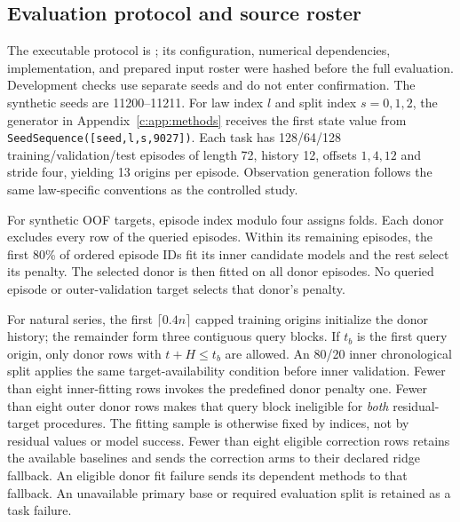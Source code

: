 \subsection{Evaluation protocol and source roster}
\label{app:target-protocol}

The executable protocol is ;
its configuration, numerical dependencies, implementation, and prepared
input roster were hashed before the full evaluation. Development checks use separate
seeds and do not enter confirmation. The synthetic seeds are
11200--11211. For law index $l$ and split index $s=0,1,2$, the generator in Appendix~\ref{c:app:methods} receives the first state value from
\texttt{SeedSequence([seed,l,s,9027])}. Each task has 128/64/128
training/validation/test episodes of length 72, history 12, offsets
$1,4,12$ and stride four, yielding 13 origins per episode.
Observation generation follows the same law-specific conventions as
the controlled study.

For synthetic OOF targets, episode index modulo four assigns folds.
Each donor excludes every row of the queried episodes. Within its
remaining episodes, the first 80\% of ordered episode IDs fit its
inner candidate models and the rest select its penalty. The selected
donor is then fitted on all donor episodes. No queried episode or
outer-validation target selects that donor's penalty.

For natural series, the first $\lceil0.4n\rceil$ capped training origins
initialize the donor history; the remainder form three contiguous query
blocks. If $t_b$ is the first query origin, only donor rows with
$t+H\leq t_b$ are allowed. An 80/20 inner chronological split applies
the same target-availability condition before inner validation.
Fewer than eight inner-fitting rows invokes the predefined donor
penalty one. Fewer than eight outer donor rows makes that query block
ineligible for \emph{both} residual-target procedures. The fitting
sample is otherwise fixed by indices, not by residual values or model
success. Fewer than eight eligible correction rows retains the available
baselines and sends the correction arms to their declared ridge fallback.
An eligible donor fit failure sends its dependent methods to that
fallback. An unavailable primary base or required evaluation split is
retained as a task failure.

